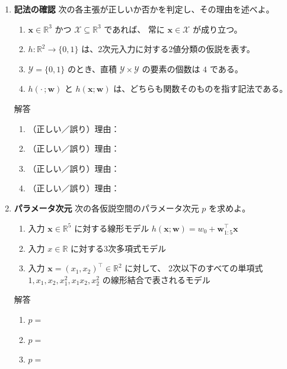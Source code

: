 \documentclass[a4paper,dvipdfmx]{jsarticle}
\newcommand{\学籍番号}{0000000}
\newcommand{\氏名}{氏名を書く}
\newcommand{\提出日}{2026年10月1日}
\newenvironment{answer}{\begin{itembox}[l]{解答}}{\end{itembox}}
\begin{document}
\begin{enumerate}
  \item \textbf{記法の確認}\quad
    次の各主張が正しいか否かを判定し、その理由を述べよ。
    \begin{enumerate}
      \item $\bm{x} \in \mathbb{R}^3$ かつ $\mathcal{X} \subseteq \mathbb{R}^3$ であれば、
        常に $\bm{x} \in \mathcal{X}$ が成り立つ。
      \item $h : \mathbb{R}^2 \to \{0, 1\}$ は、2次元入力に対する2値分類の仮説を表す。
      \item $\mathcal{Y} = \{0, 1\}$ のとき、直積 $\mathcal{Y} \times \mathcal{Y}$ の要素の個数は $4$ である。
      \item $h(\cdot\,; \bm{w})$ と $h(\bm{x}; \bm{w})$ は、どちらも関数そのものを指す記法である。
    \end{enumerate}
    \begin{answer}
      \begin{enumerate}
        \item （正しい／誤り）理由：
        \item （正しい／誤り）理由：
        \item （正しい／誤り）理由：
        \item （正しい／誤り）理由：
      \end{enumerate}
    \end{answer}

  \item \textbf{パラメータ次元}\quad
    次の各仮説空間のパラメータ次元 $p$ を求めよ。
    \begin{enumerate}
      \item 入力 $\bm{x} \in \mathbb{R}^5$ に対する線形モデル $h(\bm{x}; \bm{w}) = w_0 + \bm{w}_{1:5}^\top \bm{x}$
      \item 入力 $x \in \mathbb{R}$ に対する3次多項式モデル
      \item 入力 $\bm{x} = (x_1, x_2)^\top \in \mathbb{R}^2$ に対して、
        2次以下のすべての単項式 $1, x_1, x_2, x_1^2, x_1 x_2, x_2^2$ の線形結合で表されるモデル
    \end{enumerate}
    \begin{answer}
      \begin{enumerate}
        \item $p = $
        \item $p = $
        \item $p = $
      \end{enumerate}
    \end{answer}


\end{enumerate}
\end{document}
